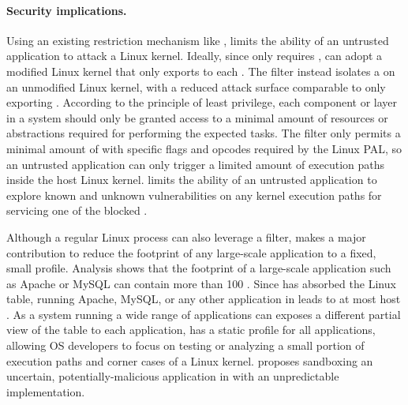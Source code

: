 

\paragraph{Security implications.}
Using an existing \linuxapi{} restriction mechanism like \seccomp{},
\graphene{} limits the ability of an untrusted application to attack a Linux kernel.
Ideally, since \thelibos{} only requires \thehostabi{},
\graphene{} can adopt a modified Linux kernel
that only exports \palcallnum{} \hostapis{} to each \picoproc{}.
The \seccomp{} filter instead isolates a \picoproc{} on an unmodified Linux kernel,
with a reduced attack surface 
comparable to only exporting \thehostabi{}.
According to the principle of least privilege,
each component or layer in a system should only be granted access to a minimal amount of resources or abstractions
required for performing the expected tasks.
The \seccomp{} filter only permits
a minimal amount of \linuxapis{} with specific flags and opcodes
required by the Linux PAL,
so an untrusted application
can only trigger
a limited amount of execution paths inside the host Linux kernel.
\graphene{} limits
the ability of an untrusted application to explore
known and unknown vulnerabilities
on any kernel execution paths for servicing one of the blocked \linuxapis{}.



Although a regular Linux process can also leverage a \seccomp{} filter,
\graphene{} makes a major contribution
to reduce the \linuxapi{} footprint of any large-scale application
to a fixed, small \linuxapi{} profile.
Analysis %
shows that the \linuxapi{}  footprint of a large-scale application such as Apache or MySQL can contain more than 100 \linuxapis{}.
Since \thelibos{} has absorbed the Linux \linuxapi{} table,
running Apache, MySQL, or any other application in \graphene{} leads to at most \hostsyscallnum{} host \linuxapis{}.
As a system
running a wide range of applications
can exposes a different partial view of the \linuxapi{} table to each application,
\graphene{}
has a static \linuxapi{} profile for all applications,
allowing OS developers to focus
on testing or analyzing a small portion of execution paths and corner cases
of a Linux kernel.
\citet{sun15unpredictability}
proposes sandboxing an uncertain, potentially-malicious application
in \graphene{}
with an unpredictable \thelibos{} implementation.








